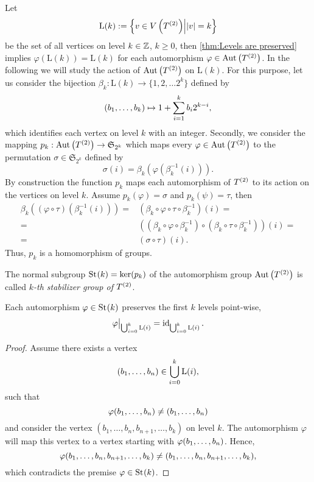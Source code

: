 Let
\begin{equation*}
\mathrm{L}(k):=\left\lbrace v\in\VT\middle\vert \lvert v\rvert=k\right\rbrace
\end{equation*}
be the set of all vertices on level $k\in\Z$, $k\geq 0$,  then \cref{thm:Levels are preserved} implies $\varphi(\mathrm{L}(k))=\mathrm{L}(k)$ for each automorphism $\varphi\in\AutT$. In the following we will study the action of $\AutT$ on $\mathrm{L}(k)$. For this purpose, let us consider the bijection $\beta_k\colon\mathrm{L}(k)\to\lbrace 1,2,\ldots 2^k\rbrace$ defined by 
\begin{equation*}
(\seq[k]{b})\mapsto 1+\sum_{i=1}^{k} b_i2^{k-i},
\end{equation*}
which identifies each vertex on level $k$ with an integer. Secondly, we consider the mapping $p_k:\AutT\to\mathfrak{S}_{2^k}$ which maps every $\varphi\in\AutT$ to the permutation $\sigma\in\mathfrak{S}_{2^k}$ defined by
\begin{equation*}
\sigma(i)=\beta_k(\varphi(\beta_k^{-1}(i))).
\end{equation*}
By construction the function $p_k$ maps each automorphism of $\T$ to its action on the vertices on level $k$. Assume $p_k(\varphi)=\sigma$ and $p_k(\psi)=\tau$, then
\begin{align*}
\beta_k((\varphi\circ\tau)(\beta_k^{-1}(i)))=&(\beta_k\circ\varphi\circ\tau\circ \beta_k^{-1})(i)=\\
=&((\beta_k\circ\varphi\circ \beta_k^{-1})\circ(\beta_k\circ\tau\circ \beta_k^{-1}))(i)=\\
=&(\sigma\circ\tau)(i).
\end{align*}
Thus, $p_k$ is a homomorphism of groups.

\begin{defin}\label{def:Stabilizer Group}
The normal subgroup $\St{k}=\ker(p_k)$ of the automorphism group $\AutT$ is called \textit{$k$-th stabilizer group of $\T$}.
\end{defin}

\begin{pro}
Each automorphism $\varphi\in\St{k}$ preserves the first $k$ levels point-wise, \ie{}
\begin{equation*}
\varphi\big\vert_{\bigcup_{i=0}^k\mathrm{L}(i)}=\id_{\bigcup_{i=0}^k\mathrm{L}(i)}.
\end{equation*}
\end{pro}
\begin{proof}
Assume there exists a vertex 
\begin{equation*}
(\seq{b})\in\bigcup_{i=0}^k\mathrm{L}(i),
\end{equation*}
such that 
\begin{equation*}
\varphi(\seq{b})\neq (\seq{b})
\end{equation*}
and consider the vertex $(b_1,\ldots,b_n,b_{n+1},\ldots,b_k)$ on level $k$. The automorphism $\varphi$ will map this vertex to a vertex starting with $\varphi(\seq{b})$. Hence, 
\begin{equation*}
\varphi(\seq{b},b_{n+1},\ldots,b_k)\neq(b_1,\ldots,b_n,b_{n+1},\ldots,b_k),
\end{equation*}
which contradicts the premise $\varphi\in\St{k}$. 
\end{proof}